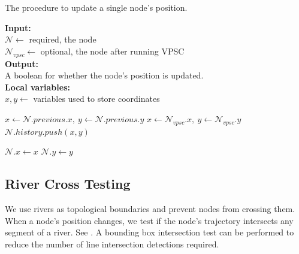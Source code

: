 \begin{algorithm}[tb!]
    \caption{The procedure to update a single node's position.}\label{alg:move position}

    \textbf{Input:} \\
    $ \mathcal{N} \gets $ required, the node \\
    $ \mathcal{N}_{vpsc} \gets $ optional, the node after running VPSC \\

    \textbf{Output:} \\
    A boolean for whether the node's position is updated. \\

    \textbf{Local variables:} \\
    $ x,y \gets $ variables used to store coordinates \\

    \begin{algorithmic}[1]
            \item[] 
            \State {}
        \EndIf

        \item[] 
        \item[] 
            \State $ x \gets \mathcal{N}.previous.x,~y \gets \mathcal{N}.previous.y $
        \Else
            \State $ x \gets \mathcal{N}_{vpsc}.x,~y \gets \mathcal{N}_{vpsc}.y $
            \State $ \mathcal{N}.history.push(x, y) $
        \EndIf

        \State $ \mathcal{N}.x \gets x $
        \State $ \mathcal{N}.y \gets y $
        \State {}
        \EndProcedure
    \end{algorithmic}
\end{algorithm}


\subsection{River Cross Testing}

We use rivers as topological boundaries and prevent nodes from crossing them. When a node's position changes, we test if the node's trajectory intersects any segment of a river. See . A bounding box intersection test can be performed to reduce the number of line intersection detections required.


